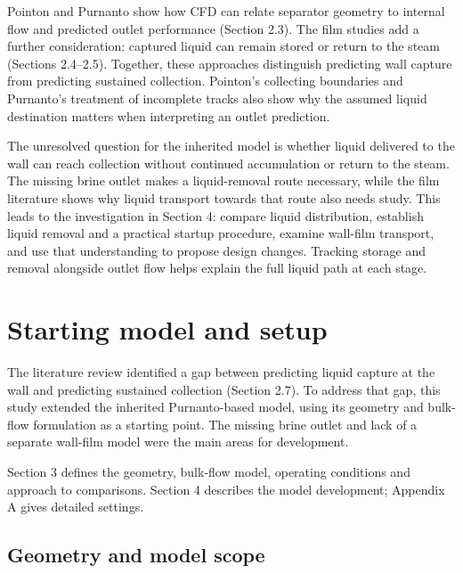 \documentclass[12pt]{article}
\begin{document}
Pointon and Purnanto show how CFD can relate separator geometry to internal flow and predicted outlet performance (Section 2.3). The film studies add a further consideration: captured liquid can remain stored or return to the steam (Sections 2.4--2.5). Together, these approaches distinguish predicting wall capture from predicting sustained collection. Pointon's collecting boundaries and Purnanto's treatment of incomplete tracks also show why the assumed liquid destination matters when interpreting an outlet prediction.

The unresolved question for the inherited model is whether liquid delivered to the wall can reach collection without continued accumulation or return to the steam. The missing brine outlet makes a liquid-removal route necessary, while the film literature shows why liquid transport towards that route also needs study. This leads to the investigation in Section 4: compare liquid distribution, establish liquid removal and a practical startup procedure, examine wall-film transport, and use that understanding to propose design changes. Tracking storage and removal alongside outlet flow helps explain the full liquid path at each stage.

\section{Starting model and setup}\label{starting-model-and-setup}

The literature review identified a gap between predicting liquid capture at the wall and predicting sustained collection (Section 2.7). To address that gap, this study extended the inherited Purnanto-based model, using its geometry and bulk-flow formulation as a starting point. The missing brine outlet and lack of a separate wall-film model were the main areas for development.

Section 3 defines the geometry, bulk-flow model, operating conditions and approach to comparisons. Section 4 describes the model development; Appendix A gives detailed settings.

\subsection{Geometry and model scope}\label{geometry-and-model-scope}
\end{document}
